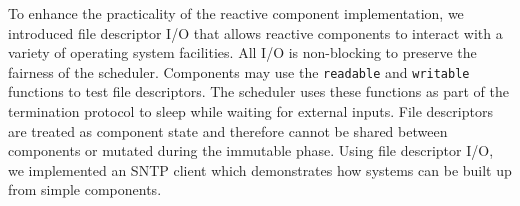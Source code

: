 To enhance the practicality of the reactive component implementation, we introduced file descriptor I/O that allows reactive components to interact with a variety of operating system facilities.
All I/O is non-blocking to preserve the fairness of the scheduler.
Components may use the \verb+readable+ and \verb+writable+ functions to test file descriptors.
The scheduler uses these functions as part of the termination protocol to sleep while waiting for external inputs.
File descriptors are treated as component state and therefore cannot be shared between components or mutated during the immutable phase.
Using file descriptor I/O, we implemented an SNTP client which demonstrates how systems can be built up from simple components.



